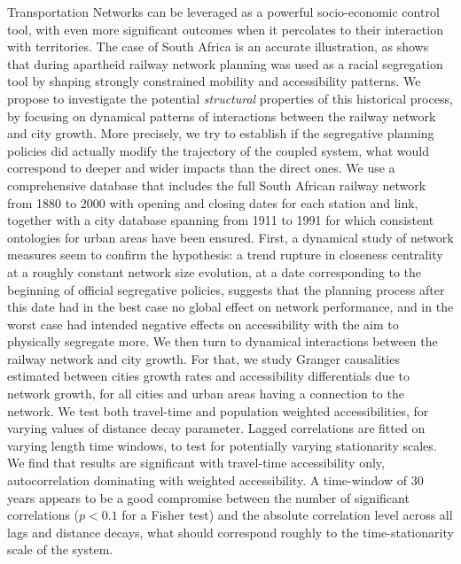 \documentclass[11pt]{article}
\begin{document}
Transportation Networks can be leveraged as a powerful socio-economic control tool, with even more significant outcomes when it percolates to their interaction with territories. The case of South Africa is an accurate illustration, as \cite{baffi:tel-01389347} shows that during apartheid railway network planning was used as a racial segregation tool by shaping strongly constrained mobility and accessibility patterns. We propose to investigate the potential \emph{structural} properties of this historical process, by focusing on dynamical patterns of interactions between the railway network and city growth. More precisely, we try to establish if the segregative planning policies did actually modify the trajectory of the coupled system, what would correspond to deeper and wider impacts than the direct ones. We use a comprehensive database that includes the full South African railway network from 1880 to 2000 with opening and closing dates for each station and link, together with a city database spanning from 1911 to 1991 for which consistent ontologies for urban areas have been ensured.%
 First, a dynamical study of network measures seem to confirm the hypothesis: a trend rupture in closeness centrality at a roughly constant network size evolution, at a date corresponding to the beginning of official segregative policies, suggests that the planning process after this date had in the best case no global effect on network performance, and in the worst case had intended negative effects on accessibility with the aim to physically segregate more. We then turn to dynamical interactions between the railway network and city growth. For that, we study Granger causalities estimated between cities growth rates and accessibility differentials due to network growth, for all cities and urban areas having a connection to the network. We test both travel-time and population weighted accessibilities, for varying values of distance decay parameter. Lagged correlations are fitted on varying length time windows, to test for potentially varying stationarity scales. We find that results are significant with travel-time accessibility only, autocorrelation dominating with weighted accessibility. A time-window of 30 years appears to be a good compromise between the number of significant correlations ($p<0.1$ for a Fisher test) and the absolute correlation level across all lags and distance decays, what should correspond roughly to the time-stationarity scale of the system.%
\end{document}
